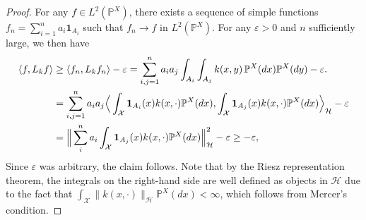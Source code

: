 \documentclass[a4paper,11pt]{article} %
\numberwithin{equation}{section}
\theoremstyle{definition}
\theoremstyle{remark}
\theoremstyle{plain}
\begin{document}
\begin{proof}[Proof]%
  For any \( f \in L^{2}(\mathbb{P}^{X}) \), there exists a sequence of simple functions \( f_{n} = \sum_{i = 1}^{n} a_{i} \mathbf{1}_{A_{i}} \) such that \( f_{n} \to f \) in \( L^{2}(\mathbb{P}^{X}) \).
  For any \( \varepsilon > 0 \) and \( n \) sufficiently large, we then have
  \begin{align}
    \langle f, L_{k} f \rangle 
    & \ge 
    \langle f_{n}, L_{k} f_{n} \rangle - \varepsilon 
    = 
    \sum_{i, j = 1}^{n}
    a_{i} a_{j}
    \int_{A_{i}} \int_{A_{j}} k(x, y) \, \mathbb{P}^{X}(d x) \mathbb{P}^{X}(d y) 
    -
    \varepsilon.
    \\
    & = 
    \sum_{i, j = 1}^{n} a_{i} a_{j} \Big\langle \int_{\mathcal{X}} \mathbf{1}_{A_{i}}(x) k(x,\cdot) \mathbb{P}^{X}(d x),
            \int_{\mathcal{X}} \mathbf{1}_{A_{j}}(x) k(x,\cdot) \mathbb{P}^{X}(d x)  
    \Big\rangle_{\mathcal{H}}  - \varepsilon\\
    &=\Big\|\sum_{i}^{n} a_{i}\int_{\mathcal{X}} \mathbf{1}_{A_{j}}(x) k(x,\cdot) \mathbb{P}^{X}(d x)\Big\|_{\mathcal{H}}^2  - \varepsilon
    \ge 
    - \varepsilon, 
    \notag
  \end{align}
  Since $\varepsilon$ was arbitrary, the claim follows. Note that by the Riesz representation theorem, the integrals on the right-hand side are well defined as objects in \( \mathcal{H} \) due to the fact that \( \int_{\mathcal{X}} \| k(x,\cdot) \|_{\mathcal{H}} \mathbb{P}^{X}(d x) < \infty \), which follows from Mercer's condition.
\end{proof}%
\end{document}
